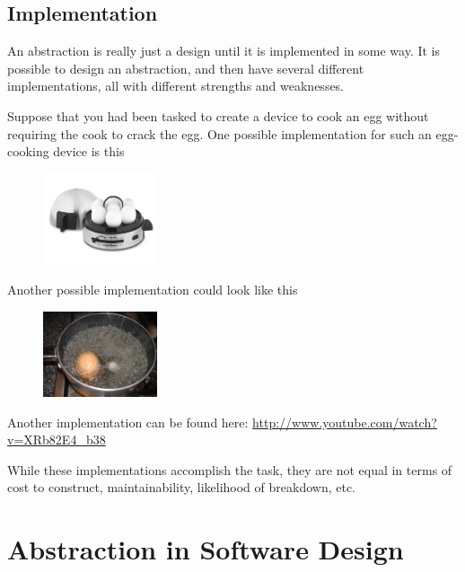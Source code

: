 \subsection{Implementation}

An abstraction is really just a design until it is implemented in some way. It is possible to design an abstraction, and then have several different implementations, all with different strengths and weaknesses.

Suppose that you had been tasked to create a device to cook an egg without requiring the cook to crack the egg. One possible implementation for such an egg-cooking device is this

\begin{figure}[H]
\centering
\includegraphics[width=0.3\textwidth]{pictures/chefschoice-electric-egg-cooker-c.jpg}
\label{fig:eggCooker1}
\end{figure}

Another possible implementation could look like this

\begin{figure}[H]
\centering
\includegraphics[width=0.3\textwidth]{pictures/boiled-egg-300x225.jpg}
\label{fig:eggCooker2}
\end{figure}


Another implementation can be found here:  \url{http://www.youtube.com/watch?v=XRb82E4_b38}

While these implementations accomplish the task, they are not equal in terms of cost to construct, maintainability, likelihood of breakdown, etc.



\section{Abstraction in Software Design}

